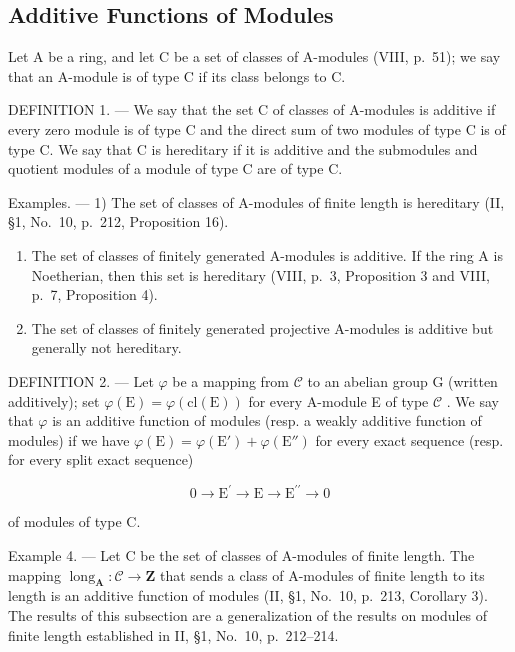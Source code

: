 \subsection{Additive Functions of Modules}

Let A be a ring, and let C be a set of classes of A-modules (VIII, p.~51); we say that an A-module is of type C if its class belongs to C.

DEFINITION 1. --- We say that the set C of classes of A-modules is additive if every zero module is of type C and the direct sum of two modules of type C is of type C. We say that C is hereditary if it is additive and the submodules and quotient modules of a module of type C are of type C.

Examples. --- 1) The set of classes of A-modules of finite length is hereditary (II, §1, No.~10, p.~212, Proposition 16).

\begin{enumerate}
\def\labelenumi{\arabic{enumi})}
\setcounter{enumi}{1}
\item
  The set of classes of finitely generated A-modules is additive. If the ring A is Noetherian, then this set is hereditary (VIII, p.~3, Proposition 3 and VIII, p.~7, Proposition 4).
\item
  The set of classes of finitely generated projective A-modules is additive but generally not hereditary.
\end{enumerate}

DEFINITION 2. --- Let \(\varphi\) be a mapping from \(\mathcal{C}\) to an abelian group G (written additively); set \(\varphi(\mathrm{E}) = \varphi(\mathrm{cl}(\mathrm{E}))\) for every A-module E of type \(\mathcal{C}\) . We say that \(\varphi\) is an additive function of modules (resp. a weakly additive function of modules) if we have \(\varphi(\mathrm{E}) = \varphi(\mathrm{E}') + \varphi(\mathrm{E}'')\) for every exact sequence (resp. for every split exact sequence)

\[
0 \longrightarrow \mathrm{E} ^ {\prime} \longrightarrow \mathrm{E} \longrightarrow \mathrm{E} ^ {\prime \prime} \longrightarrow 0
\]

of modules of type C.

Example 4. --- Let C be the set of classes of A-modules of finite length. The mapping \(\operatorname{long}_{\mathbf{A}} : \mathcal{C} \to \mathbf{Z}\) that sends a class of A-modules of finite length to its length is an additive function of modules (II, §1, No.~10, p.~213, Corollary 3). The results of this subsection are a generalization of the results on modules of finite length established in II, §1, No.~10, p.~212--214.


